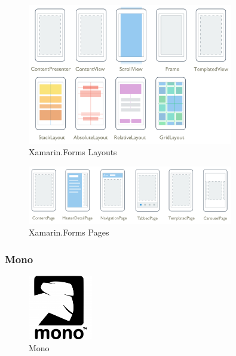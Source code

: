 \begin{figure}[h]
	\begin{center}
		\includegraphics[width=0.8\textwidth]{images/technische_grundlagen/layout.png}
	\end{center}	
	\caption{Xamarin.Forms Layouts \cite{Xamarin.Xamarin.FormsLayouts}}
	\label{fig:layout}
\end{figure}

\noindent

\begin{figure}[h]
	\begin{center}
		\includegraphics[width=0.8\textwidth]{images/technische_grundlagen/pages.png}
	\end{center}	
	\caption{Xamarin.Forms Pages \cite{Xamarin.Xamarin.FormsPages}}
	\label{fig:pages}
\end{figure}

\newpage
\subsubsection{Mono}\label{mono}

\begin{figure}
	\begin{center}
		\includegraphics[width=0.25\textwidth]{images/technische_grundlagen/mono.png}
	\end{center}
	\caption{Mono \cite{Mono.MonoProject}}
	\label{fig:mono}
\end{figure}

